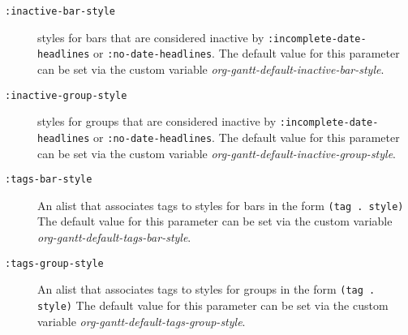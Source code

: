 \documentclass[11pt]{article}
\begin{document}
\begin{description}
\item[{\texttt{:inactive-bar-style}}] styles for bars that are considered inactive by \texttt{:incomplete-date-headlines} or \texttt{:no-date-headlines}. The default value for this parameter can be set via the custom variable \emph{org-gantt-default-inactive-bar-style}.
\item[{\texttt{:inactive-group-style}}] styles for groups that are considered inactive by \texttt{:incomplete-date-headlines} or \texttt{:no-date-headlines}. The default value for this parameter can be set via the custom variable \emph{org-gantt-default-inactive-group-style}.
\item[{\texttt{:tags-bar-style}}] An alist that associates tags to styles for bars in the form \texttt{(tag . style)} The default value for this parameter can be set via the custom variable \emph{org-gantt-default-tags-bar-style}.
\item[{\texttt{:tags-group-style}}] An alist that associates tags to styles for groups in the form \texttt{(tag . style)} The default value for this parameter can be set via the custom variable \emph{org-gantt-default-tags-group-style}.
\end{description}
\end{document}
